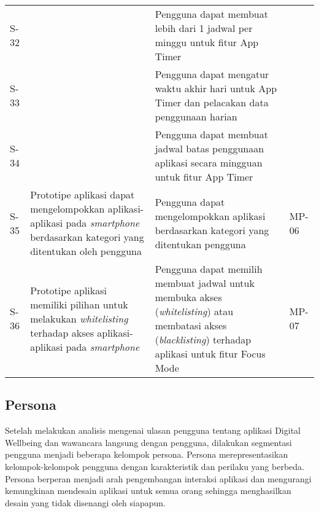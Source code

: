 \begin{small}
\begin{longtable}[c]{|W{c}{0.07\textwidth}|>{\baselineskip=12pt}p{0.3\textwidth}|>{\baselineskip=12pt}p{0.39\textwidth}|>{\centering\arraybackslash\baselineskip=12pt}m{0.11\textwidth}|}
  S-32 &  
  & Pengguna dapat membuat lebih dari 1 jadwal per minggu untuk fitur App Timer   
  & \\  
  
  S-33 &  
  & Pengguna dapat mengatur waktu akhir hari untuk App Timer dan pelacakan data penggunaan harian  
  & \\  
  
  S-34 &  
  & Pengguna dapat membuat jadwal batas penggunaan aplikasi secara mingguan untuk fitur App Timer   
  & \\ \hline
  
  
  S-35
  & Prototipe aplikasi dapat mengelompokkan aplikasi-aplikasi pada \textit{smartphone} berdasarkan kategori yang ditentukan oleh pengguna
  & Pengguna dapat mengelompokkan aplikasi berdasarkan kategori yang ditentukan pengguna
  & MP-06 \\ \hline
  
  S-36
  & Prototipe aplikasi memiliki pilihan untuk melakukan \textit{whitelisting} terhadap akses aplikasi-aplikasi pada \textit{smartphone} 
  & Pengguna dapat memilih membuat jadwal untuk membuka akses (\textit{whitelisting}) atau membatasi akses (\textit{blacklisting}) terhadap aplikasi untuk fitur Focus Mode   
  & MP-07 \\ \hline
  

\end{longtable}
\end{small}
\justifying

\FloatBarrier


\subsection{Persona}
Setelah melakukan analisis mengenai ulasan pengguna tentang aplikasi Digital Wellbeing dan wawancara langsung dengan pengguna, dilakukan segmentasi pengguna menjadi beberapa kelompok persona. Persona merepresentasikan kelompok-kelompok pengguna dengan karakteristik dan perilaku yang berbeda. Persona berperan menjadi arah pengembangan interaksi aplikasi dan mengurangi kemungkinan mendesain aplikasi untuk semua orang sehingga menghasilkan desain yang tidak disenangi oleh siapapun. \parencite{cooper2014face}




